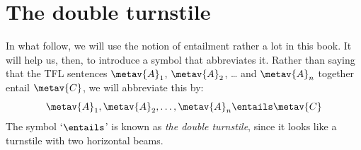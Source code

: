 



\section{The double turnstile}
In what follow, we will use the notion of entailment rather a lot in this book. It will help us, then, to introduce a symbol that abbreviates it. Rather than saying that the TFL sentences $\metav{A}_1$, $\metav{A}_2$, \dots{} and $\metav{A}_n$ together entail $\metav{C}$, we will abbreviate this by:
	$$\metav{A}_1, \metav{A}_2, \dots, \metav{A}_n \entails \metav{C}$$
The symbol `$\entails$' is known as \emph{the double turnstile}, since it looks like a turnstile with two horizontal beams.

